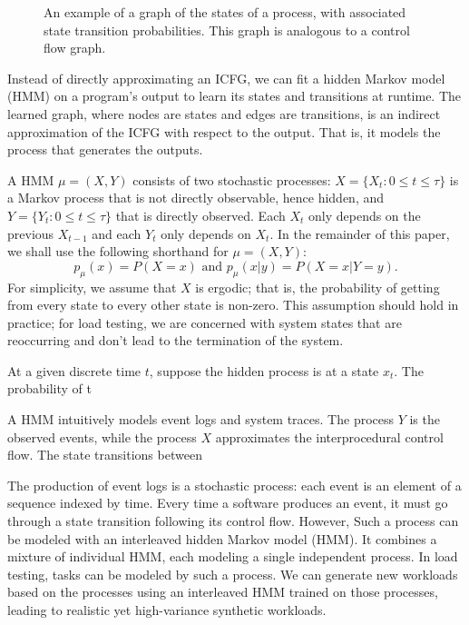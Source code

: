 \begin{figure}
    \caption{An example of a graph of the states of a process, with associated state transition probabilities. This graph is analogous to a control flow graph.}
    \label{fig:state_graph}
    \vspace{2ex}
\end{figure}

Instead of directly approximating an ICFG, we can fit a hidden Markov model (HMM) on a program's output to learn its states and transitions at runtime. The learned graph, where nodes are states and edges are transitions, is an indirect approximation of the ICFG with respect to the output. That is, it models the process that generates the outputs.

A HMM \(\mu = (X, Y)\) consists of two stochastic processes: \(X = \{X_t : 0 \leq t \leq \tau\}\) is a Markov process that is not directly observable, hence hidden, and \(Y = \{Y_t : 0 \leq t \leq \tau\}\) that is directly observed. Each \(X_t\) only depends on the previous \(X_{t-1}\) and each \(Y_t\) only depends on \(X_t\). In the remainder of this paper, we shall use the following shorthand for \(\mu = (X, Y)\): 
\[p_\mu(x) = P(X = x) \text{ and } p_\mu(x | y) = P(X = x | Y = y).\]
For simplicity, we assume that \(X\) is ergodic; that is, the probability of getting from every state to every other state is non-zero. This assumption should hold in practice; for load testing, we are concerned with system states that are reoccurring and don't lead to the termination of the system.

At a given discrete time \(t\), suppose the hidden process is at a state \(x_t\). The probability of t

A HMM intuitively models event logs and system traces. The process \(Y\) is the observed events, while the process \(X\) approximates the interprocedural control flow. The state transitions between 

The production of event logs is a stochastic process: each event is an element of a sequence indexed by time. Every time a software produces an event, it must go through a state transition following its control flow. However, Such a process can be modeled with an interleaved hidden Markov model (HMM). It combines a mixture of individual HMM, each modeling a single independent process. In load testing, tasks can be modeled by such a process. We can generate new workloads based on the processes using an interleaved HMM trained on those processes, leading to realistic yet high-variance synthetic workloads.


